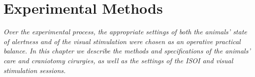 \chapter{Experimental Methods}
\label{cap:ExperimentalMethods}

\textit{Over the experimental process, the appropriate settings of both the animals' state of alertness and of the visual stimulation were chosen as an operative practical balance. In this chapter we describe the methods and specifications of the animals' care and craniotomy cirurgies, as well as the settings of the ISOI and visual stimulation sessions.}






\cleardoublepage